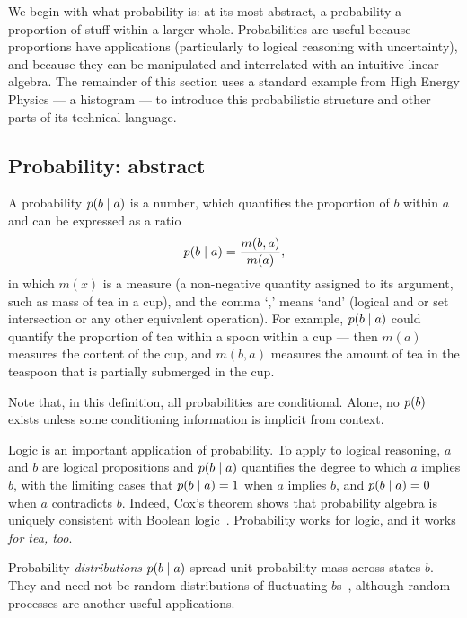 We begin with what probability is: at its most abstract, a probability a
proportion of stuff within a larger whole.
Probabilities are useful because proportions have applications
(particularly to logical reasoning with uncertainty), and because
they can be manipulated and interrelated with an intuitive linear algebra.
The remainder of this section uses a standard example from High Energy Physics
--- a histogram ---
to introduce this probabilistic structure and other parts of its technical
language.


\subsection{Probability: abstract}
A probability $p(b \mid a)$ is a number, which quantifies the proportion
of $b$ within $a$ and can be expressed as a ratio~\cite{axioms1010038}
\begin{equation}
\label{eqn:searches_prob_ratio}
p(b \mid a) = \frac{m(b, a)}{m(a)},
\end{equation}
in which $m(x)$ is a measure (a non-negative quantity assigned to its
argument, such as mass of tea in a cup), and the comma `,' means `and'
(logical and or set intersection or any other equivalent operation).
For example, $p(b \mid a)$ could quantify the proportion of tea within
a spoon within a cup --- then $m(a)$ measures the content of the cup, and
$m(b, a)$ measures the amount of tea in the teaspoon that is partially
submerged in the cup.

Note that, in this definition, all probabilities are conditional.
Alone, no $p(b)$ exists unless some conditioning information is implicit
from context.

Logic is an important application of probability.
To apply to logical reasoning, $a$ and $b$ are logical propositions and
$p(b \mid a)$ quantifies the degree to which $a$ implies $b$, with the
limiting cases that $p(b \mid a) = 1$ when $a$ implies $b$,
and $p(b \mid a) = 0$ when $a$ contradicts $b$.
Indeed, Cox's theorem shows that probability algebra is uniquely consistent
with Boolean logic~\cite{
cox1946probability,
cox1961algebra,
garrett1998nand,
jaynes2003probability,
keynes1920treatise
}.
Probability works for logic, and it works \emph{for tea, too}.

Probability \emph{distributions} $p(b \mid a)$ spread unit probability mass
across states $b$.
They and need not be random distributions of fluctuating $b$s~\cite{
jaynes2003probability,
frankfurt2005on
},
although random processes are another useful applications.

